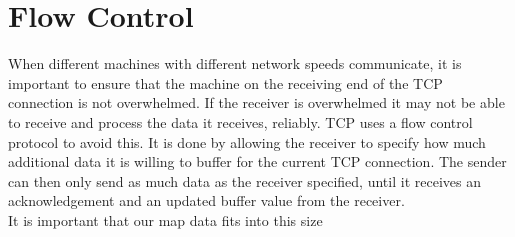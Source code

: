 \section{Flow Control}
When different machines with different network speeds communicate, it is important to ensure that the machine on the receiving end of the TCP connection is not overwhelmed. If the receiver is overwhelmed it may not be able to receive and process the data it receives, reliably. TCP uses a flow control protocol to avoid this. It is done by allowing the receiver to specify how much additional data it is willing to buffer for the current TCP connection. The sender can then only send as much data as the receiver specified, until it receives an acknowledgement and an updated buffer value from the receiver.\\

It is important that our map data fits into this size